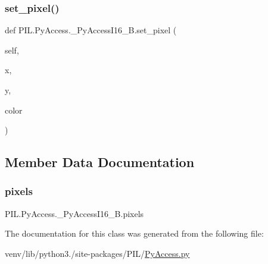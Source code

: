 \subsubsection{\texorpdfstring{set\+\_\+pixel()}{set\_pixel()}}
{\footnotesize\ttfamily def P\+I\+L.\+Py\+Access.\+\_\+\+Py\+Access\+I16\+\_\+\+B.\+set\+\_\+pixel (\begin{DoxyParamCaption}\item[{}]{self,  }\item[{}]{x,  }\item[{}]{y,  }\item[{}]{color }\end{DoxyParamCaption})}



\subsection{Member Data Documentation}
\mbox{\label{classPIL_1_1PyAccess_1_1__PyAccessI16__B_a4b92a6cb4c1012e37202be89b6138f98}} 
\subsubsection{\texorpdfstring{pixels}{pixels}}
{\footnotesize\ttfamily P\+I\+L.\+Py\+Access.\+\_\+\+Py\+Access\+I16\+\_\+\+B.\+pixels}



The documentation for this class was generated from the following file\+:\begin{DoxyCompactItemize}
\item 
venv/lib/python3./site-\/packages/\+P\+I\+L/\hyperlink{PyAccess_8py}{Py\+Access.\+py}\end{DoxyCompactItemize}
